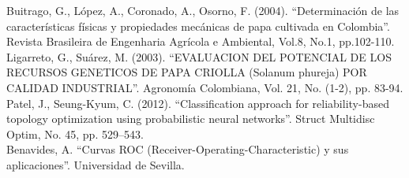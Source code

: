 \noindent
Buitrago, G., López, A., Coronado, A., Osorno, F. (2004). "`Determinación de las características físicas y propiedades mecánicas de papa cultivada en Colombia"'. Revista Brasileira de Engenharia Agrícola e Ambiental, Vol.8, No.1, pp.102-110.\\

\noindent
Ligarreto, G., Suárez, M. (2003). "`EVALUACION DEL POTENCIAL DE LOS RECURSOS GENETICOS DE PAPA CRIOLLA (Solanum phureja) POR CALIDAD INDUSTRIAL"'. Agronomía Colombiana, Vol. 21, No. (1-2), pp. 83-94.\\

\noindent 
Patel, J., Seung-Kyum, C. (2012). "`Classification approach for reliability-based topology optimization using probabilistic neural networks"'. Struct Multidisc Optim, No. 45, pp. 529–543.\\

\noindent
Benavides, A. "`Curvas ROC (Receiver-Operating-Characteristic) y sus aplicaciones"'. Universidad de Sevilla.




 